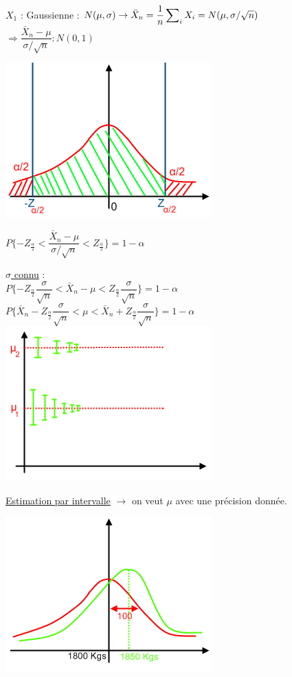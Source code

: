 \documentclass{article}
\begin{document}
$X_1$ : Gaussienne : $N(\mu,\sigma) \rightarrow \bar{X}_n = \dfrac{1}{n}\sideset{}{_i}\sum X_i = N(\mu,\sigma/\sqrt{n})$ \\
\indent $\Rightarrow \dfrac{\bar{X}_n - \mu}{\sigma/\sqrt{n}} : N(0,1)$

\includegraphics{Figure2-8.png}

$P \{ -Z_{\frac{\alpha}{2}} < \dfrac{\bar{X}_n - \mu}{\sigma/\sqrt{n}} < Z_{\frac{\alpha}{2}} \} = 1 - \alpha$ 

\underline{$\sigma$ connu} : \\

$P \{ -Z_{\frac{\alpha}{2}} \dfrac{\sigma}{\sqrt{n}} < \bar{X}_n - \mu < Z_{\frac{\alpha}{2}} \dfrac{\sigma}{\sqrt{n}}\}
= 1 - \alpha$ \\ 
\indent $P \{ \bar{X}_n - Z_{\frac{\alpha}{2}} \dfrac{\sigma}{\sqrt{n}} < \mu < \bar{X}_n + Z_{\frac{\alpha}{2}} 
\dfrac{\sigma}{\sqrt{n}}\} = 1 - \alpha$ \\ 

\includegraphics{Figure2-9.png}

\underline{Estimation par intervalle} $\rightarrow$ on veut $\mu$ avec une précision donnée.

\includegraphics{Figure2-10.png}
\end{document}
